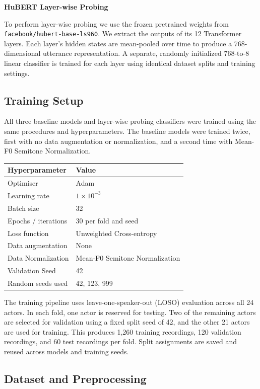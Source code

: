 \documentclass[11pt, letterpaper]{article}
\begin{document}
\textbf{HuBERT Layer-wise Probing}

To perform layer-wise probing we use the frozen pretrained weights from \texttt{facebook/hubert-base-ls960}. We extract the outputs of its 12 Transformer layers. Each layer's hidden states are mean-pooled over time to produce a 768-dimensional utterance representation. A separate, randomly initialized 768-to-8 linear classifier is trained for each layer using identical dataset splits and training settings.

\subsection{Training Setup}
All three baseline models and layer-wise probing classifiers were trained using the same procedures and hyperparameters. The baseline models were trained twice, first with no data augmentation or normalization, and a second time with Mean-F0 Semitone Normalization.

\begin{tabular}{ll}
\toprule
\textbf{Hyperparameter} & \textbf{Value} \\
\midrule
Optimiser & Adam \\
Learning rate & $1 \times 10^{-3}$ \\
Batch size & 32 \\
Epochs / iterations & 30 per fold and seed \\
Loss function & Unweighted Cross-entropy \\
Data augmentation & None \\
Data Normalization & Mean-F0 Semitone Normalization \\
Validation Seed & 42 \\
Random seeds used & 42, 123, 999 \\
\bottomrule
\end{tabular}

The training pipeline uses leave-one-speaker-out (LOSO) evaluation across all 24 actors. In each fold, one actor is reserved for testing. Two of the remaining actors are selected for validation using a fixed split seed of 42, and the other 21 actors are used for training. This produces 1,260 training recordings, 120 validation recordings, and 60 test recordings per fold. Split assignments are saved and reused across models and training seeds.

\subsection{Dataset and Preprocessing}
\end{document}
